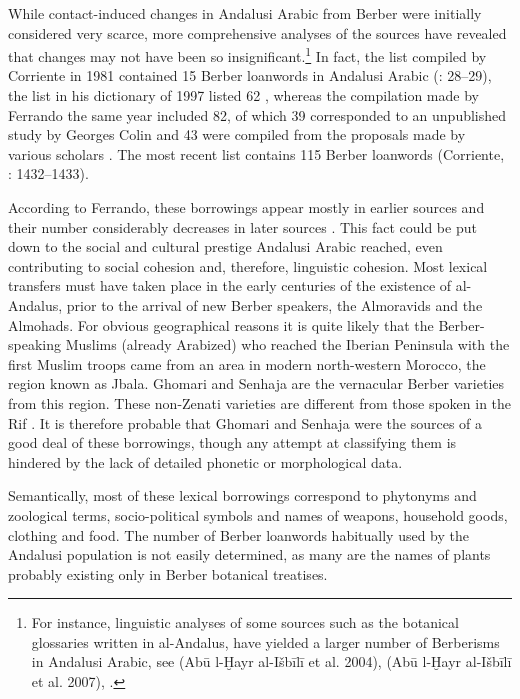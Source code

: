 \documentclass[output=paper,modfonts,nonflat]{langsci/langscibook}
\begin{document}
While contact-induced changes in Andalusi Arabic from Berber were initially considered very scarce, more comprehensive analyses of the sources have revealed that changes may not have been so insignificant.\footnote{For instance, linguistic analyses of some sources such as the botanical glossaries written in al-Andalus, have yielded a larger number of Berberisms in Andalusi Arabic, see (Abū l-Ḫayr al-Išbīlī et al. 2004), (Abū l-Ḫayr al-Išbīlī et al. 2007), \citep{Corriente2012}.} In fact, the list compiled by Corriente in 1981 contained 15 Berber loanwords in Andalusi Arabic (\citealt{Corriente1981}: 28–29), the list in his dictionary of 1997 listed 62 \citep[590]{Corriente1997b}, whereas the compilation made by Ferrando the same year included 82, of which 39 corresponded to an unpublished study by Georges Colin and 43 were compiled from the proposals made by various scholars \citep[133]{Ferrando1997}. The most recent list contains 115 Berber loanwords (Corriente, \citealt{PereiraVicente2017}: 1432–1433).

According to Ferrando, these borrowings appear mostly in earlier sources and their number considerably decreases in later sources \citep[140]{Ferrando1997}. This fact could be put down to the social and cultural prestige Andalusi Arabic reached, even contributing to social cohesion and, therefore, linguistic cohesion. Most lexical transfers must have taken place in the early centuries of the existence of al-Andalus, prior to the arrival of new Berber speakers, the Almoravids and the Almohads. For obvious geographical reasons it is quite likely that the Berber-speaking Muslims (already Arabized) who reached the Iberian Peninsula with the first Muslim troops came from an area in modern north-western Morocco, the region known as Jbala. Ghomari and Senhaja are the vernacular Berber varieties from this region. These non-Zenati varieties are different from those spoken in the Rif \citep{Kossmann2017}. It is therefore probable that Ghomari and Senhaja were the sources of a good deal of these borrowings, though any attempt at classifying them is hindered by the lack of detailed phonetic or morphological data. 

Semantically, most of these lexical borrowings correspond to phytonyms and zoological terms, socio-political symbols and names of weapons, household goods, clothing and food. The number of Berber loanwords habitually used by the Andalusi population is not easily determined, as many are the names of plants probably existing only in Berber botanical treatises. 
\end{document}
